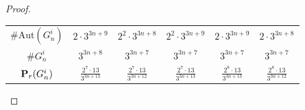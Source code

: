 \documentclass{amsart}
\theoremstyle{definition}
\theoremstyle{remark}
\begin{document}
\begin{proof}
\begin{table}[ht]
\begin{center}
\begin{tabular}{|c||c||c|c|c|c|}
 \(\#\mathrm{Aut}(G_n^i)\) & \(2\cdot 3^{3n+9}\)               & \(2^2\cdot 3^{3n+8}\)             & \(2^2\cdot 3^{3n+9}\)             & \(2\cdot 3^{3n+9}\)               & \(2\cdot 3^{3n+8}\)               \\
 \(\#G_n^i\)               & \(3^{3n+8}\)                      & \(3^{3n+7}\)                      & \(3^{3n+7}\)                      & \(3^{3n+7}\)                      & \(3^{3n+7}\)                      \\
 \({\bf P}_r(G_n^i)\)      & \(\frac{2^7\cdot 13}{3^{3n+13}}\) & \(\frac{2^7\cdot 13}{3^{3n+12}}\) & \(\frac{2^7\cdot 13}{3^{3n+13}}\) & \(\frac{2^8\cdot 13}{3^{3n+13}}\) & \(\frac{2^8\cdot 13}{3^{3n+12}}\) \\
\hline
\end{tabular}
\end{center}
\end{table}


\end{proof}
\end{document}
